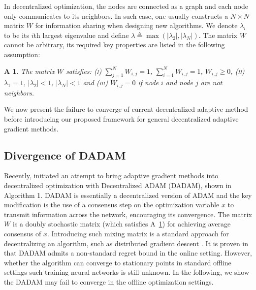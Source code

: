 \documentclass{article} %
\newtheorem{assumptionA}{A\!\!}
\begin{document}
In decentralized optimization, the nodes are connected as a graph and each node only communicates to its neighbors. 
In such case, one usually constructs a $N \times N$ matrix $W$ for information sharing when designing new algorithms. 
We denote $\lambda_i$ to be its $i$th largest eigenvalue and define $\lambda \triangleq \max (|\lambda_2|,|\lambda_N|)$.
The matrix $W$ cannot be arbitrary, its required key properties are listed in the following assumption:
\begin{assumptionA}\label{a:matrixW}
The matrix $W$ satisfies: \textsc{(i)} $\sum_{j=1}^N W_{i,j} = 1$,  $\sum_{i=1}^N W_{i,j} = 1$, $W_{i,j} \geq 0$, \textsc{(ii)} $\lambda_1 = 1$, $|\lambda_2| < 1$, $|\lambda_N| < 1 $ and \textsc{(iii)} $W_{i,j} = 0 $ if node $i$ and node $j$ are not neighbors.
\end{assumptionA}
 We now present the failure to converge of current decentralized adaptive method before introducing our proposed framework for general decentralized adaptive gradient methods.

\vspace{-0.05in}
\subsection{Divergence of DADAM}\label{sec:divergence}
\vspace{-0.05in}

Recently, \citet{nazari2019dadam} initiated an attempt to bring adaptive gradient methods into decentralized optimization with Decentralized ADAM (DADAM), shown in Algorithm 1.
DADAM is essentially a decentralized version of ADAM and the key modification is the use of a consensus step on the optimization variable $x$ to transmit information across the network, encouraging its convergence. The matrix $W$ is a doubly stochastic matrix (which satisfies A~\ref{a:matrixW}) for achieving  average consensus of $x$. 
Introducing such mixing matrix is a standard approach for decentralizing an algorithm, such as distributed gradient descent \citep{nedic2009distributed, yuan2016convergence}. 
It is proven in \citet{nazari2019dadam} that DADAM admits a non-standard regret bound in the online setting. However, whether the algorithm can converge to stationary points in standard offline settings such training neural networks is still unknown.
In the following, we show the DADAM may fail to converge in the offline optimization settings.
\end{document}
